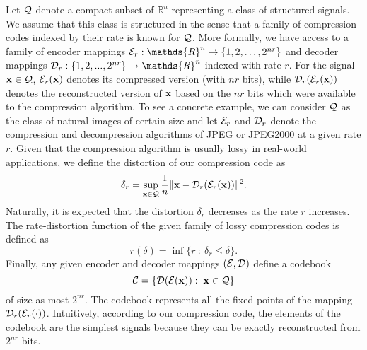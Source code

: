 \documentclass[onecolumn]{IEEEtran}
\begin{document}
Let ${\cal Q}$ denote a compact subset of $\mathds{R}^n$ representing a class of structured signals. We assume that this class is structured in the sense that a family of compression codes indexed by their rate is known for ${\cal Q}$. More formally, we have access to a family of encoder mappings $\Ec_r:\mathds{R}^n \to \{1,2,\ldots, 2^{nr}\}$ and decoder mappings $\Dc_r:\{1,2,...,2^{nr}\}\to\mathds{R}^n$ indexed with rate $r$. For the signal ${\bf x} \in {\cal Q}$, $\mathcal{E}_r({\bf x})$ denotes its compressed version  (with $nr$ bits), while $\mathcal{D}_r(\mathcal{E}_r({\bf x}))$ denotes the reconstructed version of ${\bf x}$ based on the $nr$ bits which were available to the compression algorithm. To see a concrete example, we can consider ${\cal Q}$ as the class of natural images of certain size and let $\mathcal{E}_r$ and $\mathcal{D}_r$ denote the compression and decompression algorithms of JPEG or JPEG2000 at a given rate $r$. Given that the compression algorithm is usually lossy in real-world applications, we define the distortion of our compression code as  
\[
\delta_r=\sup_{{\bf x}\in\mathcal{Q}}{1\over n} \|{\bf x}-\mathcal{D}_r(\mathcal{E}_r({\bf x}))\|^2.
\]
Naturally, it is expected that  the distortion $\delta_r$  decreases as the rate $r$ increases. The rate-distortion function of the given family of lossy compression codes is defined as
\[
r(\delta) = \inf\{r  \ : \ \delta_r \leq \delta\}. 
\]
Finally, any given encoder and decoder mappings $(\mathcal{E},\mathcal{D})$ define a codebook 
\[
\mathcal{C}=\{\mathcal{D}(\mathcal{E}({\bf x})):\; {\bf x}\in\mathcal{Q}\}
\] 
of size as most $2^{nr}$. The codebook represents all the fixed points of the mapping $\mathcal{D}_r(\mathcal{E}_r(\cdot))$. Intuitively, according to our compression code, the elements of the codebook are the simplest signals because they can be exactly reconstructed from $2^{nr}$ bits. 
\end{document}
